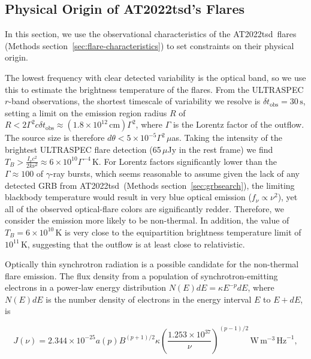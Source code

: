 \documentclass{nature_plusfigure}
\newcommand{\at}{AT2022tsd}
\begin{document}
\begin{methods}
\section{Physical Origin of \at's Flares}
\label{sec:flare-origin}

In this section, we use the observational characteristics of the \at\ flares (Methods section~\ref{sec:flare-characteristics}) to set constraints on their physical origin.

The lowest frequency with clear detected variability is the optical band, so we use this to estimate the brightness temperature of the flares.
From the ULTRASPEC $r$-band observations, the shortest timescale of variability we resolve is $\delta t_\mathrm{obs} = 30\,\mathrm{s}$, setting a limit on the emission region radius $R$ of\cite{Rybicki1986} $R<2\Gamma^2 c \delta t_\mathrm{obs} \approx (1.8\times10^{12}\,\mathrm{cm}) \Gamma^2$, where $\Gamma$ is the Lorentz factor of the outflow. 
The source size is therefore $d\theta < 5 \times 10^{-5} \Gamma^2 \,\mu$as. Taking the intensity of the brightest ULTRASPEC flare detection (65\,$\mu$Jy in the rest frame) we find $T_B > \frac{I_\nu c^2}{2 k\nu^2} \approx 6\times10^{10} \Gamma^{-4} \,$K.
For Lorentz factors significantly lower than the $\Gamma\approx100$ of $\gamma$-ray bursts, which seems reasonable to assume given the lack of any detected GRB from \at\ (Methods section~\ref{sec:grbsearch}), the limiting blackbody temperature would result in very blue optical emission ($f_\nu\propto\nu^2$), yet all of the observed optical-flare colors are significantly redder.
Therefore, we consider the emission more likely to be non-thermal.
In addition, the value of $T_B=6\times10^{10}\,$K is very close to the equipartition brightness temperature limit\cite{Readhead1994} of $10^{11}$\,K, suggesting that the outflow is at least close to relativistic. 

Optically thin synchrotron radiation is a possible candidate for the non-thermal flare emission. The flux density from a population of synchrotron-emitting electrons in a power-law energy distribution $N(E)dE = \kappa E^{-p} dE$, where $N(E)dE$ is the number density of electrons in the energy interval $E$ to $E+dE$, is\cite{Longair2011}

\begin{equation}
\label{eq:synchrotron-flux}
J(\nu) = 2.344\times10^{-25} a(p) B^{(p+1)/2} \kappa \left( \frac{1.253\times10^{37}}{\nu} \right)^{(p-1)/2}\,\mathrm{W}\,\mathrm{m}^{-3}\,\mathrm{Hz}^{-1},
\end{equation}


\end{methods}
\end{document}
